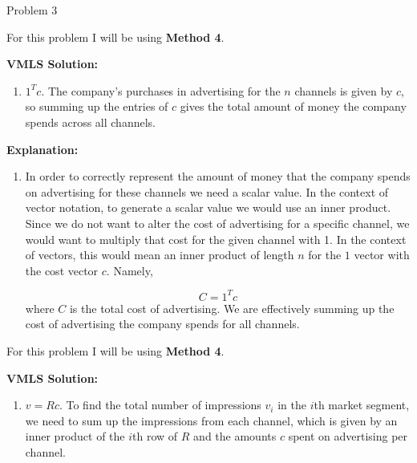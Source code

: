 \begin{problem}{Problem 3}
    \begin{Highlight}
        For this problem I will be using \textbf{Method 4}. \vspace*{1em}

        \noindent \textbf{VMLS Solution:}

        \begin{enumerate}[label = (\alph*)]
            \item $1^{T}c$. The company's purchases in advertising for the $n$ channels is given by $c$, so summing up the entries of $c$ gives the total amount of money the company spends across 
            all channels.
        \end{enumerate}

        \noindent \textbf{Explanation:}

        \begin{enumerate}[label = (\alph*)]
            \item In order to correctly represent the amount of money that the company spends on advertising for these channels we need a scalar value. In the context of vector notation, to generate
            a scalar value we would use an inner product. Since we do not want to alter the cost of advertising for a specific channel, we would want to multiply that cost for the given channel with 1.
            In the context of vectors, this would mean an inner product of length $n$ for the $1$ vector with the cost vector $c$. Namely,

            \setcounter{equation}{0}
            \begin{equation}
                C = 1^{T}c
            \end{equation}
            where $C$ is the total cost of advertising. We are effectively summing up the cost of advertising the company spends for all channels.
        \end{enumerate}
    \end{Highlight}

    \begin{Highlight}
        For this problem I will be using \textbf{Method 4}. \vspace*{1em}

        \noindent \textbf{VMLS Solution:}

        \begin{enumerate}[label = (\alph*), start = 2]
            \item $v = Rc$. To find the total number of impressions $v_{i}$ in the $i$th market segment, we need to sum up the impressions from each channel, which is given by an inner product of the 
            $i$th row of $R$ and the amounts $c$ spent on advertising per channel.
        \end{enumerate}


\end{Highlight}
\end{problem}
